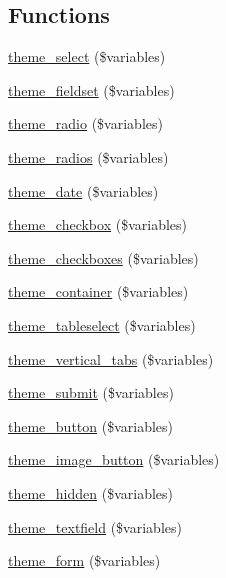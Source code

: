 \subsection*{Functions}
\begin{DoxyCompactItemize}
\item 
\hyperlink{group__themeable_ga1d5214969fb2a9be57eb444d3ec0ade2}{theme\_\-select} (\$variables)
\item 
\hyperlink{group__themeable_gaf7f2e634c1a429fd6a1c176ff2be91a9}{theme\_\-fieldset} (\$variables)
\item 
\hyperlink{group__themeable_ga1cb9f23d9d87c9189591becc9a456907}{theme\_\-radio} (\$variables)
\item 
\hyperlink{group__themeable_gafcfb357ed36fd4f881d6f8f29d67a762}{theme\_\-radios} (\$variables)
\item 
\hyperlink{group__themeable_ga78957bb9be7b270a6d3ec9ea26b4bf3e}{theme\_\-date} (\$variables)
\item 
\hyperlink{group__themeable_ga564057bbdee3072a89cee1d6e1d54168}{theme\_\-checkbox} (\$variables)
\item 
\hyperlink{group__themeable_gad099d8895d2a4e86fa807a369d533648}{theme\_\-checkboxes} (\$variables)
\item 
\hyperlink{group__themeable_ga281b0f3a41586bc5ff324919699e902f}{theme\_\-container} (\$variables)
\item 
\hyperlink{group__themeable_ga5cc90870843319efb27065ce5db8e413}{theme\_\-tableselect} (\$variables)
\item 
\hyperlink{group__themeable_ga7014edeff2fd0c053bbec25fe9a4932c}{theme\_\-vertical\_\-tabs} (\$variables)
\item 
\hyperlink{group__themeable_ga6785cbeb4d96c1b2a1dd58f8648ed4cc}{theme\_\-submit} (\$variables)
\item 
\hyperlink{group__themeable_ga6f85ebe1bce115aaa66a8e0eb4c7e001}{theme\_\-button} (\$variables)
\item 
\hyperlink{group__themeable_ga599eaa99635a647741a19b4c23ed1233}{theme\_\-image\_\-button} (\$variables)
\item 
\hyperlink{group__themeable_gaa3463af7c6de7aaa4f5c904a8d23fbaf}{theme\_\-hidden} (\$variables)
\item 
\hyperlink{group__themeable_ga1c1ad681858baaf35a5ad1d0e8d4b65b}{theme\_\-textfield} (\$variables)
\item 
\hyperlink{group__themeable_ga8b9e6ce7a301b1e072f8e83525cd7ba6}{theme\_\-form} (\$variables)
\item 

\end{DoxyCompactItemize}
